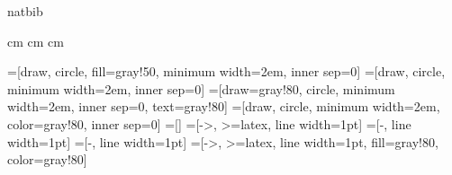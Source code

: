 \usepackage{bibtopic} 
\newcommand{\subbib}[2]{\begin{btSect}{#1}
  \subsubsection{#2}
  \btPrintCited
  \btPrintNotCited
  \end{btSect}
}
\newcommand{\SubBib}[2]{\begin{btSect}{#1}
  \chapter{#2}
  \btPrintCited
  \btPrintNotCited
  \end{btSect}
}
\newcommand{\etal}{{\it et al.}\xspace}
\newcommand{\etR}{{and R.}\xspace}
\DeclareRobustCommand{\etalchar}

\usepackage{natbib}
\usepackage{amsmath}
\usepackage{pdfpages}
\usepackage[T1]{fontenc}
\usepackage[french]{babel}
\usepackage{enumerate}
\usepackage{eurosym}
\usepackage{epsfig}
\usepackage{url}
\usepackage{color}
\usepackage{xcolor}
\usepackage{xspace}
\usepackage{cmbright}
\usepackage{tikz}

\newcommand{\SR}[2]{\textcolor{blue}{\xspace}\textcolor{gray}{#1\xspace}\textcolor{red}{!!! #2 !!!\xspace}}
\newcommand{\Col}[1]{\noindent [{\sl Collab. princip.~: #1}]\\}
\newcommand{\APT}{AgroParisTech\xspace}

\textwidth 17cm
\textheight 25.5cm 
 cm 
 cm
 cm

\newcommand{\ns}{2em}
\newcommand{\veu}{2*\ns} %
\newcommand{\heu}{2.5*\ns} %
=[draw, circle, fill=gray!50, minimum width=\ns, inner sep=0]
=[draw, circle, minimum width=\ns, inner sep=0]
=[draw=gray!80, circle, minimum width=\ns, inner sep=0, text=gray!80]
=[draw, circle, minimum width=\ns, color=gray!80, inner sep=0]
=[]
=[->, >=latex, line width=1pt]
=[-, line width=1pt]
=[-, line width=1pt]
=[->, >=latex, line width=1pt, fill=gray!80, color=gray!80]
